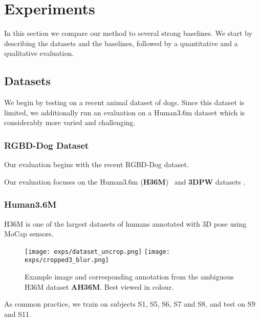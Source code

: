 \section{Experiments}\label{s:exp}

In this section we compare our method to several strong baselines.
We start by describing the datasets and the baselines, followed by a quantitative and a qualitative evaluation.





\subsection{Datasets}

We begin by testing on a recent animal dataset of dogs. Since this dataset is limited, we additionally run an evaluation on a Human3.6m dataset which is considerably more varied and challenging.

\subsubsection{RGBD-Dog Dataset}

Our evaluation begins with the recent RGBD-Dog dataset. 

Our evaluation focuses on the Human3.6m (\textbf{H36M})~\cite{ionescu2013human3,IonescuSminchisescu11} 
and \textbf{3DPW} datasets \cite{vonmarcard2018recovering}.

\subsubsection{Human3.6M}

H36M is one of the largest datasets of humans annotated with 3D pose using MoCap sensors.
\begin{wrapfigure}{r}{0.45\textwidth}
  \begin{center}
           \texttt{[image: exps/dataset\_uncrop.png]}
    \texttt{[image: exps/cropped3\_blur.png]}
  \end{center}
    \caption{Example image and corresponding annotation from the ambiguous H36M dataset \textbf{AH36M}. Best viewed in colour.\label{f:ambi_samples}}
    \vspace{-1.8em}
\end{wrapfigure}

As common practice, we train on subjects S1, S5, S6, S7 and S8, and test on S9 and S11. 

